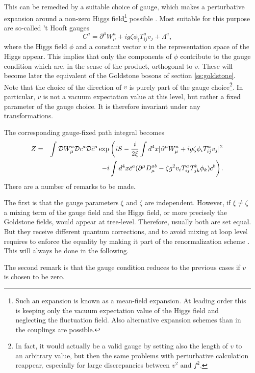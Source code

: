 \documentclass[final,12pt,3p,longtitle]{elsarticle}
\newcommand*{\no}{\noindent}
\newcommand*{\bea}{\begin{eqnarray}}
\newcommand*{\eea}{\end{eqnarray}}
\newcommand*{\be}{\begin{equation}}
\newcommand*{\ee}{\end{equation}}
\newcommand*{\pd}{\partial}
\newcommand*{\nn}{\nonumber}
\newcommand*{\1}{1\!\!\!\bot}
\begin{document}
This can be remedied by a suitable choice of gauge, which makes a perturbative expansion around a non-zero Higgs field\footnote{Such an expansion is known as a mean-field expansion. At leading order this is keeping only the vacuum expectation value of the Higgs field and neglecting the fluctuation field. Also alternative expansion schemes than in the couplings are possible.} possible \cite{Lee:1972fj,Lee:1974zg,Lee:1972yfa,Bohm:2001yx}. Most suitable for this purpose are so-called 't Hooft gauges \cite{Bohm:2001yx}
\be
C^a=\pd^\mu W_\mu^a+ig\zeta\phi_iT^a_{ij} v_j+\Lambda^a\label{thooftg},
\ee
\no where the Higgs field $\phi$ and a constant vector $v$ in the representation space of the Higgs appear. This implies that only the components of $\phi$ contribute to the gauge condition which are, in the sense of the product, orthogonal to $v$. These will become later the equivalent of the Goldstone bosons of section \ref{ss:goldstone}. Note that the choice of the direction of $v$ is purely part of the gauge choice\footnote{In fact, it would actually be a valid gauge by setting also the length of $v$ to an arbitrary value, but then the same problems with perturbative calculation reappear, especially for large discrepancies between $v^2$ and $f^2$.}. In particular, $v$ is not a vacuum expectation value at this level, but rather a fixed parameter of the gauge choice. It is therefore invariant under any transformations.

The corresponding gauge-fixed path integral becomes
\bea
Z&=&\int{\cal D}W_\mu^a{\cal D}c^a{\cal D}{\bar c}^a\exp\left(iS-\frac{i}{2\xi}\int d^4 x|\pd^\mu W_\mu^a+ig\zeta\phi_iT^a_{ij} v_j|^2\right.\nn\\
&&\left.-i\int d^4x \bar{c}^a(\pd^\mu D_\mu^{ab}-\zeta g^2 v_iT^a_{ij}T^b_{jk}\phi_k) c^b\right)\label{thla}.
\eea
\no There are a number of remarks to be made.

The first is that the gauge parameters $\xi$ and $\zeta$ are independent. However, if $\xi\neq\zeta$ a mixing term of the gauge field and the Higgs field, or more precisely the Goldstone fields, would appear at tree-level. Therefore, usually both are set equal. But they receive different quantum corrections, and to avoid mixing at loop level requires to enforce the equality by making it part of the renormalization scheme \cite{Bohm:2001yx}. This will always be done in the following.

The second remark is that the gauge condition reduces to the previous cases if $v$ is chosen to be zero.
\end{document}
